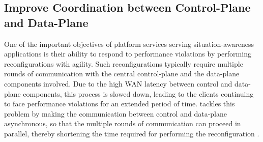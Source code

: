 \subsection{Improve Coordination between Control-Plane and Data-Plane}
One of the important objectives of platform services serving situation-awareness applications is their ability to respond to performance violations by performing reconfigurations with agility. Such reconfigurations typically require multiple rounds of communication with the central control-plane and the data-plane components involved. Due to the high WAN latency between control and data-plane components, this process is slowed down, leading to the clients continuing to face performance violations for an extended period of time. \epulsar{} tackles this problem by making the communication between control and data-plane asynchronous, so that the multiple rounds of communication can proceed in parallel, thereby shortening the time required for performing the reconfiguration \cite{epulsar}.


